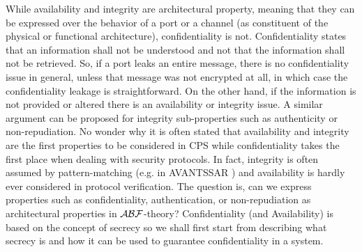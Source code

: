 While availability and integrity are architectural property, meaning that they
can be expressed over the behavior of a port or a channel (as constituent of
the physical or functional architecture), confidentiality is not.
Confidentiality states that an information shall not be understood and not that
the information shall not be retrieved. So, if a port leaks an entire message,
there is no confidentiality issue in general, unless that message was not
encrypted at all, in which case the confidentiality leakage is straightforward. 
On the other hand, if the
information is not provided or altered there is an availability or integrity
issue. A similar argument can be proposed for integrity sub-properties such as
authenticity or non-repudiation. No wonder why it is often stated that
availability and integrity are the first properties to be considered in CPS
while confidentiality takes the first place when dealing with security
protocols. In fact, integrity is often assumed by pattern-matching (e.g. in
AVANTSSAR \autocite{avantssar}) and availability is hardly ever considered in
protocol verification. The question is, can we express properties such as
confidentiality, authentication, or non-repudiation as architectural properties
in $\mathcal{A}\mathcal{B}\mathcal{F}$-theory? Confidentiality (and Availability) is based on the concept 
of secrecy so we shall first start from describing what secrecy is and how it
can be used to guarantee confidentiality in a system.

